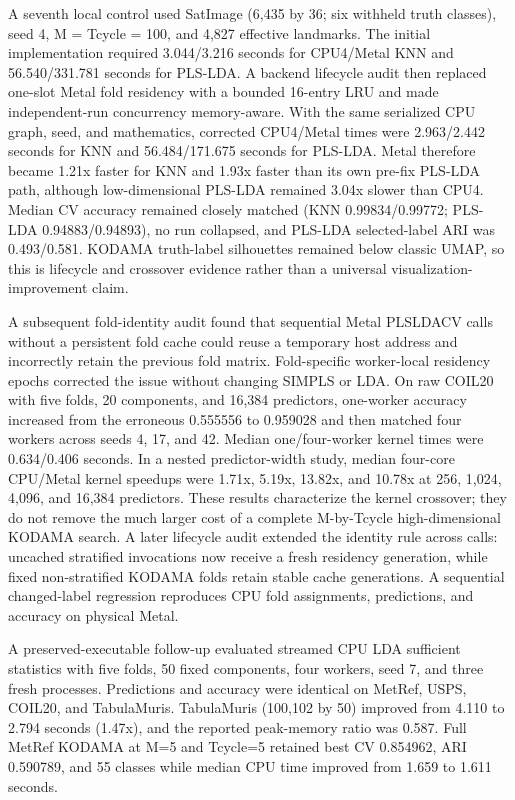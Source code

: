 \documentclass[twoside,11pt]{article}
\begin{document}
\begin{small}
A seventh local control used SatImage (6,435 by 36; six withheld truth classes), seed 4, M = Tcycle = 100, and 4,827 effective landmarks. The initial implementation required 3.044/3.216 seconds for CPU4/Metal KNN and 56.540/331.781 seconds for PLS-LDA. A backend lifecycle audit then replaced one-slot Metal fold residency with a bounded 16-entry LRU and made independent-run concurrency memory-aware. With the same serialized CPU graph, seed, and mathematics, corrected CPU4/Metal times were 2.963/2.442 seconds for KNN and 56.484/171.675 seconds for PLS-LDA. Metal therefore became 1.21x faster for KNN and 1.93x faster than its own pre-fix PLS-LDA path, although low-dimensional PLS-LDA remained 3.04x slower than CPU4. Median CV accuracy remained closely matched (KNN 0.99834/0.99772; PLS-LDA 0.94883/0.94893), no run collapsed, and PLS-LDA selected-label ARI was 0.493/0.581. KODAMA truth-label silhouettes remained below classic UMAP, so this is lifecycle and crossover evidence rather than a universal visualization-improvement claim.

A subsequent fold-identity audit found that sequential Metal PLSLDACV calls without a persistent fold cache could reuse a temporary host address and incorrectly retain the previous fold matrix. Fold-specific worker-local residency epochs corrected the issue without changing SIMPLS or LDA. On raw COIL20 with five folds, 20 components, and 16,384 predictors, one-worker accuracy increased from the erroneous 0.555556 to 0.959028 and then matched four workers across seeds 4, 17, and 42. Median one/four-worker kernel times were 0.634/0.406 seconds. In a nested predictor-width study, median four-core CPU/Metal kernel speedups were 1.71x, 5.19x, 13.82x, and 10.78x at 256, 1,024, 4,096, and 16,384 predictors. These results characterize the kernel crossover; they do not remove the much larger cost of a complete M-by-Tcycle high-dimensional KODAMA search. A later lifecycle audit extended the identity rule across calls: uncached stratified invocations now receive a fresh residency generation, while fixed non-stratified KODAMA folds retain stable cache generations. A sequential changed-label regression reproduces CPU fold assignments, predictions, and accuracy on physical Metal.

A preserved-executable follow-up evaluated streamed CPU LDA sufficient statistics with five folds, 50 fixed components, four workers, seed 7, and three fresh processes. Predictions and accuracy were identical on MetRef, USPS, COIL20, and TabulaMuris. TabulaMuris (100,102 by 50) improved from 4.110 to 2.794 seconds (1.47x), and the reported peak-memory ratio was 0.587. Full MetRef KODAMA at M=5 and Tcycle=5 retained best CV 0.854962, ARI 0.590789, and 55 classes while median CPU time improved from 1.659 to 1.611 seconds.


\end{small}
\end{document}
